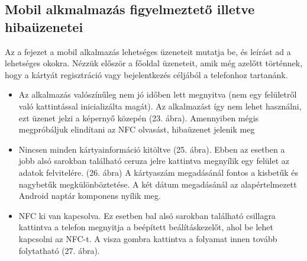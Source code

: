 \subsection{Mobil alkmalmazás figyelmeztető illetve hibaüzenetei}
Az a fejezet a mobil alkalmazás lehetséges üzeneteit mutatja be, és leírást ad a lehetséges okokra. Nézzük először a főoldal üzeneteit, amik még azelőtt történnek, hogy a kártyát regisztráció vagy bejelentkezés céljából a telefonhoz tartanánk.
\begin{itemize}
\item Az alkalmazás valószínűleg nem jó időben lett megnyitva (nem egy felületről való kattintással inicializálta magát). Az alkalmazást így nem lehet használni, ezt üzenet jelzi a képernyő közepén (23. ábra). Amennyiben mégis megpróbáljuk elindítani az NFC olvasást, hibaüzenet jelenik meg
\item Nincsen minden kártyainformáció kitöltve (25. ábra). Ebben az esetben a jobb alsó sarokban található ceruza jelre kattintva megnyílik egy felület az adatok felvitelére. (26. ábra)
A kártyaszám megadásánál fontos a kisbetűk és nagybetűk megkülönböztetése. A két dátum megadásánál az alapértelmezett Android naptár komponens nyílik meg.
\item NFC ki van kapcsolva. Ez esetben bal alsó sarokban található csillagra kattintva a telefon megnyitja a beépített beálításkezelőt, ahol be lehet kapcsolni az NFC-t. A visza gombra kattintva a folyamat innen tovább folytatható (27. ábra).
\end{itemize}

